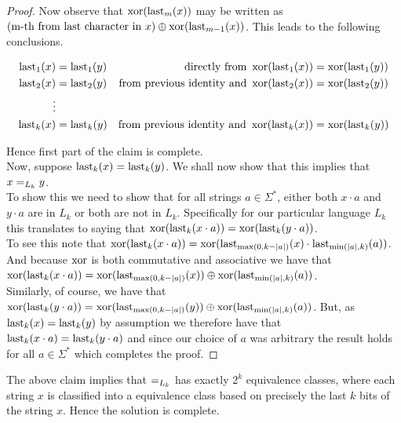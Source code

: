 \begin{soln}
\begin{proof}
Now observe that $\operatorname{xor}(\operatorname{last}_{m} (x))$ may be written as $(\text{m-th from last character in $x$}) \oplus \operatorname{xor}(\operatorname{last}_{m-1} (x))$. This leads to the following conclusions.

\begin{align*}
    \operatorname{last}_{1} (x) &= \operatorname{last}_{1} (y) & \text {directly from }  \operatorname{xor}(\operatorname{last}_{1} (x)) &= \operatorname{xor}(\operatorname{last}_{1} (y))\\
    \operatorname{last}_{2} (x) &= \operatorname{last}_{2} (y) & \text {from previous identity and } \operatorname{xor}(\operatorname{last}_{2} (x)) &= \operatorname{xor}(\operatorname{last}_{2} (y))\\
    \vdots\\
    \operatorname{last}_{k} (x) &= \operatorname{last}_{k} (y) & \text {from previous identity and } \operatorname{xor}(\operatorname{last}_{k} (x)) &= \operatorname{xor}(\operatorname{last}_{k} (y))\\
\end{align*}

Hence first part of the claim is complete.\\

Now, suppose $\operatorname{last}_{k} (x) = \operatorname{last}_{k} (y)$. We shall now show that this implies that $x =_{L_k} y$.\\
To show this we need to show that for all strings $a \in \Sigma^*$, either both $x \cdot a$ and $y \cdot a$ are in $L_k$ or both are not in $L_k$. Specifically for our particular language $L_k$ this translates to saying that $\operatorname{xor}(\operatorname{last}_{k} (x \cdot a)) = \operatorname{xor}(\operatorname{last}_{k} (y \cdot a))$.\\

To see this note that $\operatorname{xor}(\operatorname{last}_{k} (x \cdot a)) = \operatorname{xor}(\operatorname{last}_{\max(0, k-|a|)} (x) \cdot \operatorname{last}_{\min(|a|, k)} (a))$. And because $\operatorname{xor}$ is both commutative and associative we have that $\operatorname{xor}(\operatorname{last}_{k} (x \cdot a)) = \operatorname{xor}(\operatorname{last}_{\max(0, k-|a|)} (x)) \oplus \operatorname{xor}(\operatorname{last}_{\min(|a|, k)} (a))$.\\

Similarly, of course, we have that $\operatorname{xor}(\operatorname{last}_{k} (y \cdot a)) = \operatorname{xor}(\operatorname{last}_{\max(0, k-|a|)} (y)) \oplus \operatorname{xor}(\operatorname{last}_{\min(|a|, k)} (a))$. But, as $\operatorname{last}_{k} (x) = \operatorname{last}_{k} (y)$ by assumption we therefore have that $\operatorname{last}_{k} (x \cdot a) = \operatorname{last}_{k} (y \cdot a)$ and since our choice of $a$ was arbitrary the result holds for all $a \in \Sigma^*$ which completes the proof.

\end{proof}

The above claim implies that $=_{L_k}$ has exactly $2^k$ equivalence classes, where each string $x$ is classified into a equivalence class based on precisely the last $k$ bits of the string $x$. Hence the solution is complete.

\end{soln}